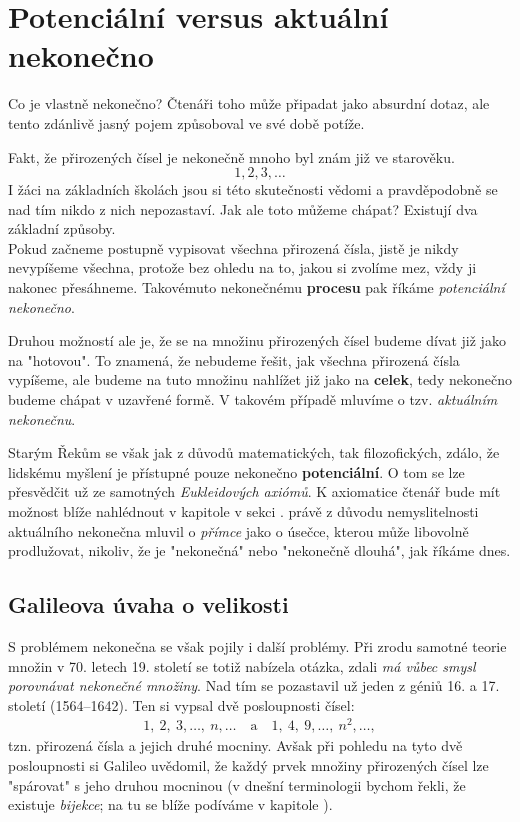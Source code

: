 \section{Potenciální versus aktuální nekonečno}

Co je vlastně nekonečno? Čtenáři toho může připadat jako absurdní dotaz, ale tento zdánlivě jasný pojem způsoboval ve své době potíže.\par
Fakt, že přirozených čísel je nekonečně mnoho byl znám již ve starověku.
\begin{equation*}
1,2,3,\dots
\end{equation*}
I žáci na základních školách jsou si této skutečnosti vědomi a pravděpodobně se nad tím nikdo z nich nepozastaví. Jak ale toto můžeme chápat? Existují dva základní způsoby.\\
Pokud začneme postupně vypisovat všechna přirozená čísla, jistě je nikdy nevypíšeme všechna, protože bez ohledu na to, jakou si zvolíme mez, vždy ji nakonec přesáhneme. Takovémuto nekonečnému \textbf{procesu} pak říkáme \emph{potenciální nekonečno}.\par
Druhou možností ale je, že se na množinu přirozených čísel budeme dívat již jako na "hotovou". To znamená, že nebudeme řešit, jak všechna přirozená čísla vypíšeme, ale budeme na tuto množinu nahlížet již jako na \textbf{celek}, tedy nekonečno budeme chápat v uzavřené formě. V takovém případě mluvíme o tzv. \emph{aktuálním nekonečnu}.
\medskip

Starým Řekům se však jak z důvodů matematických, tak filozofických, zdálo, že lidskému myšlení je přístupné pouze nekonečno \textbf{potenciální}. O tom se lze přesvědčit už ze samotných \emph{Eukleidových axiómů}. K axiomatice čtenář bude mít možnost blíže nahlédnout v kapitole  v sekci .  právě z důvodu nemyslitelnosti aktuálního nekonečna mluvil o \emph{přímce} jako o úsečce, kterou může libovolně prodlužovat, nikoliv, že je "nekonečná" nebo "nekonečně dlouhá", jak říkáme dnes.

\subsection{Galileova úvaha o velikosti}
\label{subsec:galileo}

S problémem nekonečna se však pojily i další problémy. Při zrodu samotné teorie množin v 70. letech 19. století se totiž nabízela otázka, zdali \emph{má vůbec smysl porovnávat nekonečné množiny}. Nad tím se pozastavil už jeden z géniů 16. a 17. století  (1564--1642). Ten si vypsal dvě posloupnosti čísel:
\begin{align*}
1,\ 2,\ 3,\dots,\ n,\dots \quad \text{a} \quad 1,\ 4,\ 9,\dots,\ n^2,\dots ,
\end{align*}
tzn. přirozená čísla a jejich druhé mocniny. Avšak při pohledu na tyto dvě posloupnosti si Galileo uvědomil, že každý prvek množiny přirozených čísel lze "spárovat" s jeho druhou mocninou (v dnešní terminologii bychom řekli, že existuje \emph{bijekce}; na tu se blíže podíváme v kapitole ).

